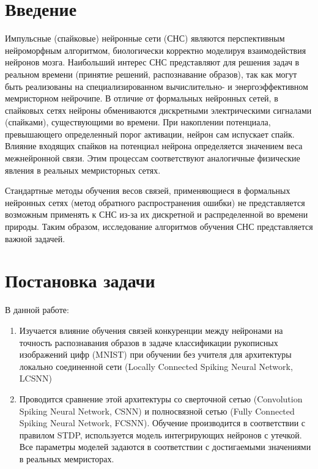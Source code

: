 \documentclass[a4paper]{article}
\begin{document}
\thispagestyle{empty} 

\tableofcontents

\section{Введение}
Импульсные (спайковые) нейронные сети (СНС) являются перспективным нейроморфным алгоритмом, биологически корректно моделируя взаимодействия нейронов мозга. Наибольший интерес СНС представляют для решения задач в реальном времени (принятие решений, распознавание образов), так как могут быть реализованы на специализированном вычислительно- и энергоэффективном мемристорном нейрочипе.  В отличие от формальных нейронных сетей, в спайковых сетях нейроны обмениваются дискретными электрическими сигналами (спайками), существующими во времени. При накоплении потенциала, превышающего определенный порог активации, нейрон сам испускает спайк. Влияние входящих спайков на потенциал нейрона определяется значением веса межнейронной связи. Этим процессам соответствуют аналогичные физические явления в реальных мемристорных сетях.

Стандартные методы обучения весов связей, применяющиеся в формальных нейронных сетях (метод обратного распространения ошибки) не представляется возможным применять к СНС из-за их дискретной и распределенной во времени природы. Таким образом, исследование алгоритмов обучения СНС представляется важной задачей.

\section{Постановка задачи}
В данной работе:

\begin{enumerate}
 \item Изучается влияние обучения связей конкуренции \cite{MaxActiv1} \cite{MaxActiv2} между нейронами на точность распознавания образов в задаче классификации рукописных изображений цифр (MNIST) при обучении без учителя для архитектуры локально соединенной сети (Locally Connected Spiking Neural Network, LCSNN) \cite{saunders2019locally}
 
 \item Проводится сравнение этой архитектуры со сверточной сетью (Convolution Spiking Neural Network, CSNN) и полносвязной сетью (Fully Connected Spiking Neural Network, FCSNN). Обучение производится в соответствии с правилом STDP, используется модель интегрирующих нейронов с утечкой. Все параметры моделей задаются в соответствии с достигаемыми значениями в реальных мемристорах.

\end{enumerate}
\end{document}
